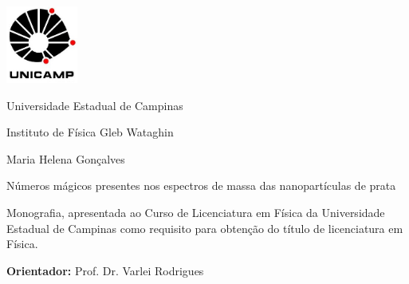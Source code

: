 \pagestyle{plain}
\vspace{-5cm}
\includegraphics[width=.94\textwidth, height=1in,
keepaspectratio=true]{logos/logo_Unicamp}

\begin{center}
{\Large {\sc Universidade Estadual de Campinas \\}

Instituto de Física  Gleb Wataghin \\
\vspace{0.5cm}
}
{\Large {\Large Maria Helena Gonçalves}\\
}

\vspace{3.5cm}
{\huge Números mágicos presentes
\vspace{0.4cm}
nos espectros de massa das nanopartículas de prata}

\vspace{2.5cm}

\end{center}

\begin{flushright}
  \begin{minipage}[c]{.5\textwidth}
        Monografia, apresentada ao Curso de Licenciatura em Física da Universidade Estadual de Campinas como requisito para obtenção do título de licenciatura em Física.
        
        \vspace{.2cm}
        \textbf{Orientador:} Prof. Dr. Varlei Rodrigues
    
  \end{minipage}
\end{flushright}

\begin{center}



\vspace{1cm}







\end{center}

\vspace{1cm}

\begin{center}

 \\
 \\

\end{center}

\newpage

$ $

\newpage
